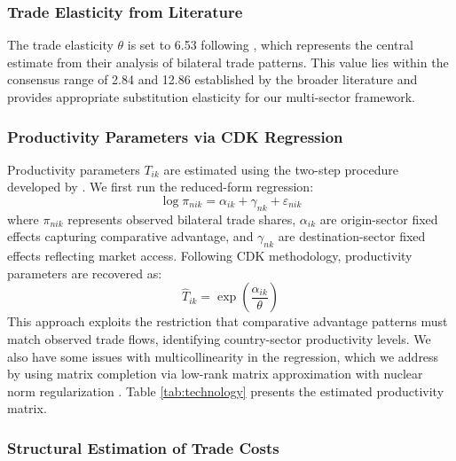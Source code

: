 \subsubsection{Trade Elasticity from Literature}

The trade elasticity $\theta$ is set to 6.53 following \cite{costinot2012TheReviewofEconomicStudies}, which represents the central estimate from their analysis of bilateral trade patterns. This value lies within the consensus range of 2.84 and 12.86 established by the broader literature \citep{eaton2002Econometrica} and provides appropriate substitution elasticity for our multi-sector framework.

\subsubsection{Productivity Parameters via CDK Regression}

Productivity parameters $T_{ik}$ are estimated using the two-step procedure developed by \cite{costinot2012TheReviewofEconomicStudies}. We first run the reduced-form regression:
\begin{equation}
\log \pi_{nik} = \alpha_{ik} + \gamma_{nk} + \varepsilon_{nik}
\end{equation}
where $\pi_{nik}$ represents observed bilateral trade shares, $\alpha_{ik}$ are origin-sector fixed effects capturing comparative advantage, and $\gamma_{nk}$ are destination-sector fixed effects reflecting market access. Following CDK methodology, productivity parameters are recovered as:
\begin{equation}\hat{T}_{ik} = \exp\left(\frac{\hat{\alpha}_{ik}}{\theta}\right)
\end{equation}
This approach exploits the restriction that comparative advantage patterns must match observed trade flows, identifying country-sector productivity levels. We also have some issues with multicollinearity in the regression, which we address by using matrix completion via low-rank matrix approximation with nuclear norm regularization \citep{mazumder2010spectral}. Table \ref{tab:technology} presents the estimated productivity matrix.

\subsubsection{Structural Estimation of Trade Costs}

